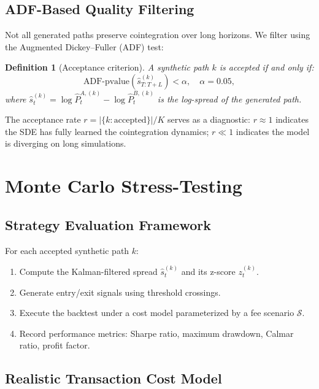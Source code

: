 \documentclass[11pt, a4paper]{article}
\newtheorem{definition}[theorem]{Definition}
\begin{document}
\subsection{ADF-Based Quality Filtering}

Not all generated paths preserve cointegration over long horizons. We filter using the Augmented Dickey--Fuller (ADF) test:

\begin{definition}[Acceptance criterion]
A synthetic path $k$ is accepted if and only if:
\begin{equation}
    \text{ADF-pvalue}\!\left(\hat{s}^{(k)}_{T:T+L}\right) < \alpha, \quad \alpha = 0.05,
\end{equation}
where $\hat{s}^{(k)}_t = \log \hat{P}^{A,(k)}_t - \log \hat{P}^{B,(k)}_t$ is the log-spread of the generated path.
\end{definition}

The acceptance rate $r = |\{k : \text{accepted}\}| / K$ serves as a diagnostic: $r \approx 1$ indicates the SDE has fully learned the cointegration dynamics; $r \ll 1$ indicates the model is diverging on long simulations.

\section{Monte Carlo Stress-Testing}
\label{sec:stress}

\subsection{Strategy Evaluation Framework}

For each accepted synthetic path $k$:
\begin{enumerate}[nosep]
    \item Compute the Kalman-filtered spread $\hat{s}^{(k)}_t$ and its z-score $z^{(k)}_t$.
    \item Generate entry/exit signals using threshold crossings.
    \item Execute the backtest under a cost model parameterized by a fee scenario $\mathcal{S}$.
    \item Record performance metrics: Sharpe ratio, maximum drawdown, Calmar ratio, profit factor.
\end{enumerate}

\subsection{Realistic Transaction Cost Model}
\end{document}
